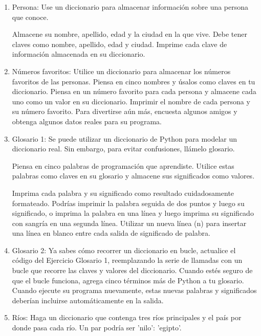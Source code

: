	\begin{enumerate}%
		
		\item  Persona: Use un diccionario para almacenar información sobre una persona que conoce.
		
		Almacene su nombre, apellido, edad y la ciudad en la que vive. Debe tener claves como nombre, apellido, edad y ciudad. 
		Imprime cada clave de información almacenada en su diccionario.
		
		
		\item Números favoritos: Utilice un diccionario para almacenar los números favoritos de las personas.
		Piensa en cinco nombres y úsalos como claves en tu diccionario. Piensa en un número favorito  para cada persona y 
		almacene cada uno como un valor en su diccionario. Imprimir el nombre de cada persona y su número favorito. 
		Para divertirse aún más, encuesta algunos amigos y obtenga algunos datos reales para su programa.
		
		
		\item Glosario 1: Se puede utilizar un diccionario de Python para modelar un diccionario real.
		Sin embargo, para evitar confusiones, llámelo glosario.
		
		Piensa en cinco palabras de programación que aprendiste. Utilice estas palabras como
		claves en su glosario y almacene sus significados como valores.
		
		Imprima cada palabra y su significado como resultado cuidadosamente formateado.
		Podrías imprimir la palabra seguida de dos puntos y luego su significado, o imprima la palabra
		en una línea y luego imprima su significado con sangría en una segunda línea. Utilizar un nueva línea ({\bf\ttfamily{\textbackslash}}n)  para insertar una línea en blanco entre cada salida de significado de palabra.
		
		
		\item  Glosario 2: Ya sabes cómo recorrer un diccionario en bucle, actualice el código del Ejercicio Glosario 1,
		reemplazando la serie de llamadas {} con un bucle que recorre las claves y valores del diccionario.
		Cuando estés seguro de que el bucle funciona, agrega cinco términos más de Python a tu glosario. 	Cuando ejecute su programa nuevamente, estas nuevas palabras y significados deberían incluirse automáticamente en la salida.
		
		\item Ríos: Haga un diccionario que contenga tres ríos principales y el país por donde pasa cada río. 
		Un par {} podría ser 'nilo': 'egipto'.
		

\end{enumerate}
